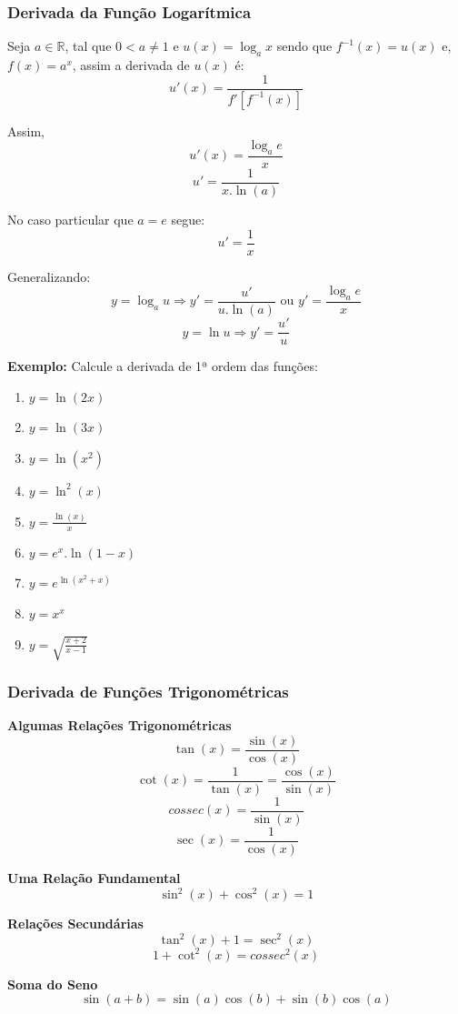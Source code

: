 \documentclass[oneside,a4paper,12pt]{article}
\begin{document}
\subsubsection{Derivada da Função Logarítmica}
Seja $a \in \mathbb{R}$, tal que $0 < a \neq 1$ e $u(x) = \log_{a}x$ sendo que $f^{-1}(x) = u(x)$ e, $f(x) = a^x$, assim a derivada de $u(x)$ é: $$u'(x) = \frac{1}{f'[f^{-1}(x)]}$$

\vspace{200pt}

Assim, $$u'(x) = \frac{\log_{a}e}{x}$$ $$u' = \frac{1}{x.\ln(a)}$$

No caso particular que $a = e$ segue: $$u' = \frac{1}{x}$$

Generalizando:
$$y = \log_{a}u \Rightarrow y' = \frac{u'}{u.\ln(a)} \text{ ou } y' = \frac{\log_{a}e}{x}$$ 
$$ y = \ln u \Rightarrow y' = \frac{u'}{u}$$

{\bf Exemplo: } Calcule a derivada de 1ª ordem das funções:
\begin{enumerate}
	\item $y = \ln(2x)$
	\item $y = \ln(3x)$
	\item $y = \ln(x^2)$
	\item $y = \ln^2(x)$
	\item $y = \frac{\ln(x)}{x}$
	\item $y = e^x.\ln(1-x)$
	\item $y = e^{\ln(x^2 + x)}$
	\item $y = x^x$
	\item $y = \sqrt{\frac{x+2}{x-1}}$
\end{enumerate}

\vspace{200pt}

\subsubsection{Derivada de Funções Trigonométricas}

{\bf Algumas Relações Trigonométricas}
$$\tan(x) = \frac{\sin(x)}{\cos(x)}$$
$$\cot(x) = \frac{1}{\tan(x)} = \frac{\cos(x)}{\sin(x)}$$
$$cossec(x) = \frac{1}{\sin(x)}$$
$$\sec(x) = \frac{1}{\cos(x)}$$

{\bf Uma Relação Fundamental}
$$\sin^2(x) + \cos^2(x) = 1$$

{\bf Relações Secundárias}
$$\tan^2(x) + 1 = \sec^2(x)$$
$$1 + \cot^2(x) = cossec ^2(x)$$

{\bf Soma do Seno}
$$\sin(a+b) = \sin(a)\cos(b) + \sin(b)\cos(a)$$
\end{document}
